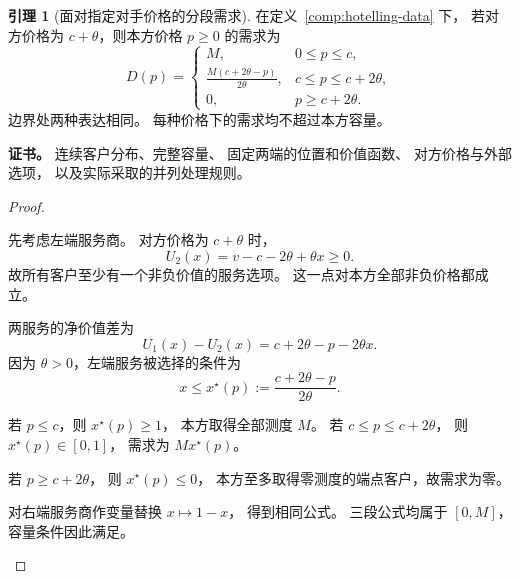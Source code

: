 \documentclass[UTF8,12pt,a4paper,openany,fontset=none,zihao=false]{ctexrep}
\theoremstyle{definition}
\newtheorem{lemma}{引理}[chapter]
\newenvironment{certificate}{\par\noindent\textbf{证书。}\ignorespaces}{\par}
\newcommand{\1}{\mathbf 1}
\begin{document}
\begin{lemma}[面对指定对手价格的分段需求]
\label{comp:demand}
在定义~\ref{comp:hotelling-data} 下，
若对方价格为 \(c+\theta\)，则本方价格 \(p\ge0\) 的需求为
\[
 D(p)=
 \begin{cases}
 M,&0\le p\le c,\\[2pt]
 \displaystyle\frac{M(c+2\theta-p)}{2\theta},
       &c\le p\le c+2\theta,\\[6pt]
 0,&p\ge c+2\theta.
 \end{cases}
\]
边界处两种表达相同。
每种价格下的需求均不超过本方容量。
\end{lemma}
\begin{certificate}
连续客户分布、完整容量、
固定两端的位置和价值函数、
对方价格与外部选项，
以及实际采取的并列处理规则。
\end{certificate}
\begin{proof}
\begin{semanticsteps}
\item 先考虑左端服务商。
对方价格为 \(c+\theta\) 时，
\[
 U_2(x)=v-c-2\theta+\theta x\ge0.
\]
故所有客户至少有一个非负价值的服务选项。
这一点对本方全部非负价格都成立。
\item 两服务的净价值差为
\[
 U_1(x)-U_2(x)=c+2\theta-p-2\theta x.
\]
因为 \(\theta>0\)，左端服务被选择的条件为
\[
 x\le x^\star(p):=\frac{c+2\theta-p}{2\theta}.
\]
\item 若 \(p\le c\)，则 \(x^\star(p)\ge1\)，
本方取得全部测度 \(M\)。
若 \(c\le p\le c+2\theta\)，
则 \(x^\star(p)\in[0,1]\)，
需求为 \(Mx^\star(p)\)。
\item 若 \(p\ge c+2\theta\)，
则 \(x^\star(p)\le0\)，
本方至多取得零测度的端点客户，故需求为零。
\item 对右端服务商作变量替换 \(x\mapsto1-x\)，
得到相同公式。
三段公式均属于 \([0,M]\)，容量条件因此满足。
\end{semanticsteps}
\end{proof}
\end{document}
